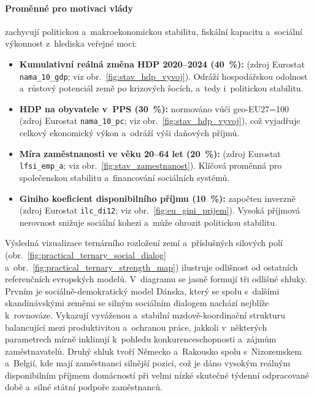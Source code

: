 \paragraph{Proměnné pro motivaci vlády}
zachycují politickou a~makroekonomickou stabilitu, fiskální kapacitu a~sociální výkonnost z~hlediska veřejné moci:
\begin{itemize}[noitemsep]
  \item \textbf{Kumulativní reálná změna \acs{HDP} 2020--2024 (\SI{40}{\percent}):} (zdroj Eurostat \texttt{nama\_10\_gdp}; viz obr.~\ref{fig:stav_hdp_vyvoj}). Odráží hospodářskou odolnost a~růstový potenciál země po krizových šocích, a~tedy i~politickou stabilitu.
  \item \textbf{\Acs{HDP} na obyvatele v~\acs{PPS} (\SI{30}{\percent}):} normováno vůči \acs{geo-EU27}=100 (zdroj Eurostat \texttt{nama\_10\_pc}; viz obr.~\ref{fig:stav_hdp_vyvoj}), což vyjadřuje celkový ekonomický výkon a~odráží výši daňových příjmů.
  \item \textbf{Míra zaměstnanosti ve věku 20–64 let (\SI{20}{\percent}):} (zdroj Eurostat \texttt{lfsi\_emp\_a}; viz obr.~\ref{fig:stav_zamestnanost}). Klíčová proměnná pro společenskou stabilitu a~financování sociálních systémů.
  \item \textbf{Giniho koeficient disponibilního příjmu (\SI{10}{\percent}):} započten inverzně (zdroj Eurostat \texttt{ilc\_di12}; viz obr.~\ref{fig:eu_gini_prijem}). Vysoká příjmová nerovnost snižuje sociální kohezi a~může ohrozit politickou stabilitu.\par
\end{itemize}

Výsledná vizualizace ternárního rozložení zemí a~příslušných silových polí (obr.~\ref{fig:practical_ternary_social_dialog} a~obr.~\ref{fig:practical_ternary_strength_map}) ilustruje odlišnost  od ostatních referenčních evropských modelů. V~diagramu se jasně formují tři odlišné shluky. Prvním je sociálně-demokratický model Dánska, který se spolu s~dalšími skandinávskými zeměmi se silným sociálním dialogem nachází nejblíže k~rovnováze. Vykazují vyváženou a~stabilní mzdově-koordinační strukturu balancující mezi produktivitou a~ochranou práce, jakkoli v~některých parametrech mírně inklinují k~pohledu konkurenceschopnosti a~zájmům zaměstnavatelů. Druhý shluk tvoří Německo a~Rakousko spolu s~Nizozemskem a~Belgií, kde mají zaměstnanci silnější pozici, což je dáno vysokým reálným disponibilním příjmem domácností při velmi nízké skutečné týdenní odpracované době a~silné státní podpoře zaměstnanců.\par

